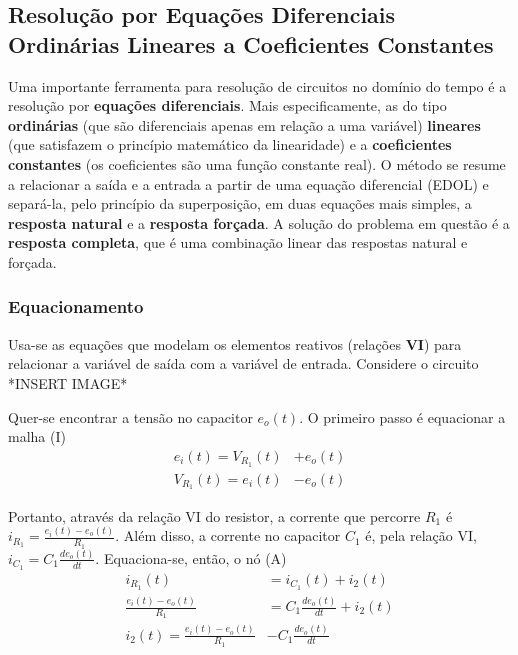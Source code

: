 \documentclass{article}
\numberwithin{equation}{section}
\begin{document}
    \subsection{Resolução por Equações Diferenciais Ordinárias Lineares a Coeficientes Constantes}
    \label{subsec:edolcc}
    Uma importante ferramenta para resolução de circuitos no domínio do tempo é a resolução por \textbf{equações diferenciais}. Mais especificamente, as do tipo \textbf{ordinárias} (que são diferenciais apenas em relação a uma variável) \textbf{lineares} (que satisfazem o princípio matemático da linearidade) e a \textbf{coeficientes constantes} (os coeficientes são uma função constante real). O método se resume a relacionar a saída e a entrada a partir de uma equação diferencial (EDOL) e separá-la, pelo princípio da superposição, em duas equações mais simples, a \textbf{resposta natural} e a \textbf{resposta forçada}. A solução do problema em questão é a \textbf{resposta completa}, que é uma combinação linear das respostas natural e forçada.

    \subsubsection{Equacionamento}
    \label{subsubsec:equacionamento}
    Usa-se as equações que modelam os elementos reativos (relações \textbf{VI}) para relacionar a variável de saída com a variável de entrada. Considere o circuito \\
    *INSERT IMAGE*

    Quer-se encontrar a tensão no capacitor $e_o(t)$. O primeiro passo é equacionar a malha (I)
    \begin{align*}
        e_{i}(t) = V_{R_{1}}(t) &+ e_{o}(t) \\
        V_{R_{1}}(t) = e_{i}(t) &- e_{o}(t)
    \end{align*}

    Portanto, através da relação VI do resistor, a corrente que percorre $R_{1}$ é $i_{ R_{1} }= \displaystyle {\frac{ e_{i}(t) - e_{o}(t) }{ R_{1}} }$. Além disso, a corrente no capacitor $C_{1}$ é, pela relação VI, $i_{ C_{1} } = C_{1} \displaystyle{ \frac{ de_{o}(t) }{ dt } }$. Equaciona-se, então, o nó (A)
    \begin{align*}
        i_{ R_{1} }(t) &= i_{ C_{1} }(t) + i_{2}(t) \\
        \frac{ e_{i}(t) - e_{o}(t) }{ R_{1}} &= C_{1}\frac{ de_{o}(t) }{ dt } + i_{2}(t) \\
        i_{2}(t) = \frac{ e_{i}(t) - e_{o}(t) }{ R_{1} } &- C_{1}\frac{ de_{o}(t) }{ dt }
    \end{align*}
\end{document}
